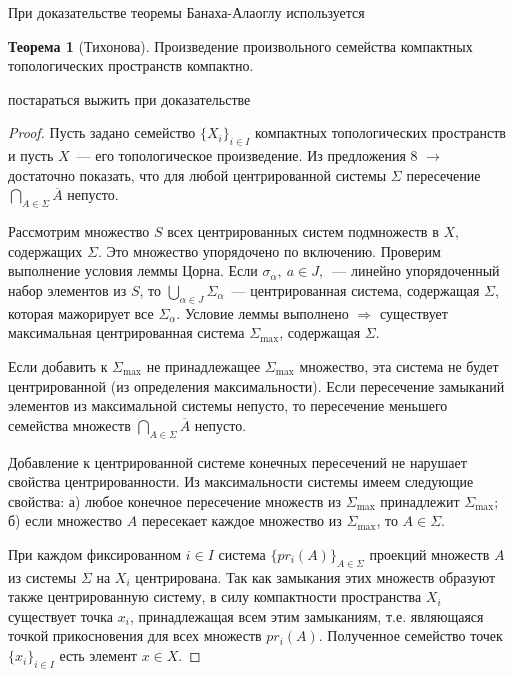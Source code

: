 \documentclass[12pt]{extarticle}
\theoremstyle{definition}
\newtheorem{theorem}{\indent Теорема}[section]
\begin{document}
    При доказательстве теоремы Банаха-Алаоглу используется

    \begin{theorem}[Тихонова]\label{th:Tikhonov}
    Произведение произвольного семейства компактных топологических пространств компактно.
    \end{theorem}

    постараться выжить при доказательстве

    \begin{proof}
    Пусть задано семейство $\{X_i\}_{i \in I}$ компактных топологических пространств и пусть $X$~--- его топологическое произведение. Из предложения 8 $\rightarrow$ достаточно показать, что для любой центрированной системы $\Sigma$ пересечение $\bigcap \limits_{A \in \Sigma} \overline{A}$ непусто.

    Рассмотрим множество $S$ всех центрированных систем подмножеств в $X$, содержащих $\Sigma$. Это множество упорядочено по включению. Проверим выполнение условия леммы Цорна. Если $\sigma_{\alpha},\ a \in J,$~--- линейно упорядоченный набор элементов из $S$, то $\bigcup \limits_{\alpha \in J} \Sigma_{\alpha}$~--- центрированная система, содержащая $\Sigma$, которая мажорирует все $\Sigma_{\alpha}$. Условие леммы выполнено $\Rightarrow$ существует максимальная центрированная система $\Sigma_{\max}$, содержащая $\Sigma$.

    Если добавить к $\Sigma_{\max}$ не принадлежащее $\Sigma_{\max}$ множество, эта система не будет центрированной (из определения максимальности). Если пересечение замыканий элементов из максимальной системы непусто, то пересечение меньшего семейства множеств $\bigcap \limits_{A \in \Sigma} \overline{A}$ непусто.

    Добавление к центрированной системе конечных пересечений не нарушает свойства центрированности. Из максимальности системы имеем следующие свойства: а) любое конечное пересечение множеств из $\Sigma_{\max}$ принадлежит $\Sigma_{\max}$; б) если множество $A$ пересекает каждое множество из $\Sigma_{\max}$, то $A \in \Sigma$.

    При каждом фиксированном $i \in I$ система $\{pr_i(A)\}_{A \in \Sigma}$ проекций множеств $A$ из системы $\Sigma$ на $X_i$ центрирована. Так как замыкания этих множеств образуют также центрированную систему, в силу компактности пространства $X_i$ существует точка $x_i$, принадлежащая всем этим замыканиям, т.е. являющаяся точкой прикосновения для всех множеств $pr_i(A)$. Полученное семейство точек $\{x_i\}_{i \in I}$ есть элемент $x \in X$.


\end{proof}
\end{document}
